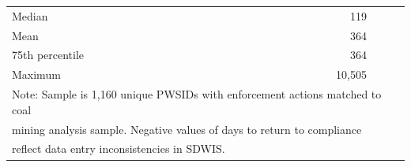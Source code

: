 \begin{table}[h!]
\begin{tabular}{lrr}
Median & 119 & \\
Mean & 364 & \\
75th percentile & 364 & \\
Maximum & 10,505 & \\
\hline\hline
\multicolumn{3}{l}{\footnotesize Note: Sample is 1,160 unique PWSIDs with enforcement actions matched to coal} \\
\multicolumn{3}{l}{\footnotesize mining analysis sample. Negative values of days to return to compliance} \\
\multicolumn{3}{l}{\footnotesize reflect data entry inconsistencies in SDWIS.} \\
\end{tabular}
\end{table}

